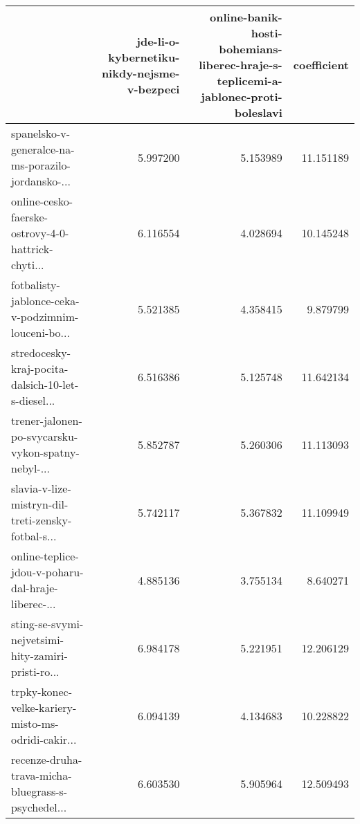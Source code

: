 \begin{tabular}{lrrr}
\toprule
{} &  jde-li-o-kybernetiku-nikdy-nejsme-v-bezpeci &  online-banik-hosti-bohemians-liberec-hraje-s-teplicemi-a-jablonec-proti-boleslavi &  coefficient \\
\midrule
spanelsko-v-generalce-na-ms-porazilo-jordansko-... &                                     5.997200 &                                           5.153989 &    11.151189 \\
online-cesko-faerske-ostrovy-4-0-hattrick-chyti... &                                     6.116554 &                                           4.028694 &    10.145248 \\
fotbalisty-jablonce-ceka-v-podzimnim-louceni-bo... &                                     5.521385 &                                           4.358415 &     9.879799 \\
stredocesky-kraj-pocita-dalsich-10-let-s-diesel... &                                     6.516386 &                                           5.125748 &    11.642134 \\
trener-jalonen-po-svycarsku-vykon-spatny-nebyl-... &                                     5.852787 &                                           5.260306 &    11.113093 \\
slavia-v-lize-mistryn-dil-treti-zensky-fotbal-s... &                                     5.742117 &                                           5.367832 &    11.109949 \\
online-teplice-jdou-v-poharu-dal-hraje-liberec-... &                                     4.885136 &                                           3.755134 &     8.640271 \\
sting-se-svymi-nejvetsimi-hity-zamiri-pristi-ro... &                                     6.984178 &                                           5.221951 &    12.206129 \\
trpky-konec-velke-kariery-misto-ms-odridi-cakir... &                                     6.094139 &                                           4.134683 &    10.228822 \\
recenze-druha-trava-micha-bluegrass-s-psychedel... &                                     6.603530 &                                           5.905964 &    12.509493 \\
\bottomrule
\end{tabular}
